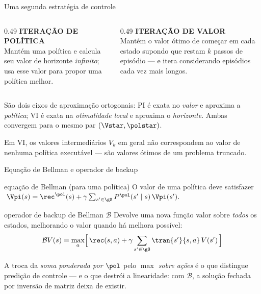 \documentclass[aspectratio=169, 11pt]{beamer}
\newcommand{\Bop}{\mathcal{B}}                 %
\begin{document}
\begin{frame}{Uma segunda estratégia de controle}
  \begin{columns}[T]
    \begin{column}{0.49\textwidth}
      {\color{rlAzulClaro}\small\bfseries ITERAÇÃO DE POLÍTICA}\\[0.3em]
      {\small Mantém uma \alert{política} e calcula seu valor de horizonte
      \emph{infinito}; usa esse valor para propor uma política melhor.}
    \end{column}
    \begin{column}{0.49\textwidth}
      {\color{rlLaranja}\small\bfseries ITERAÇÃO DE VALOR}\\[0.3em]
      {\small Mantém o \alert{valor ótimo} de começar em cada estado supondo que restam
      $k$ passos de episódio --- e itera considerando episódios cada vez mais longos.}
    \end{column}
  \end{columns}
  \vspace{0.6em}
  \begin{ideiabox}
    São dois eixos de aproximação ortogonais: PI é exata no \emph{valor} e aproxima a
    \emph{política}; VI é exata na \emph{otimalidade local} e aproxima o \emph{horizonte}.
    Ambas convergem para o mesmo par $(\Vstar, \polstar)$.
  \end{ideiabox}
  \begin{alertabox}
    Em VI, os valores intermediários $V_k$ em geral \alert{não} correspondem ao valor de
    nenhuma política executável --- são valores ótimos de um problema truncado.
  \end{alertabox}
\end{frame}

\begin{frame}{Equação de Bellman e operador de backup}
  \begin{defbox}[fontupper=\small]{equação de Bellman (para uma política)}
    O valor de uma política deve satisfazer
    \(\; \Vpi(s) = \rec^{\pol}(s) + \gamma \sum_{s' \in \gS} P^{\pol}(s' \mid s)\, \Vpi(s'). \)
  \end{defbox}
  \begin{defbox}[fontupper=\small]{operador de backup de Bellman $\Bop$}
    Devolve uma nova função valor sobre \emph{todos} os estados, melhorando o valor
    quando há melhora possível:
    \vspace{-0.5em}
    \[
      \Bop V(s) = \max_{a} \Bigl[\, \rec(s,a) + \gamma \sum_{s' \in \gS} \tran{s'}{s,a}\, V(s') \,\Bigr]
    \]
    \vspace{-1.4em}
  \end{defbox}
  \begin{ideiabox}
    A troca da \emph{soma ponderada por $\pol$} pelo \emph{$\max$ sobre ações} é o que
    distingue predição de controle --- e o que destrói a linearidade: com $\Bop$, a
    solução fechada por inversão de matriz deixa de existir.
  \end{ideiabox}
\end{frame}
\end{document}
